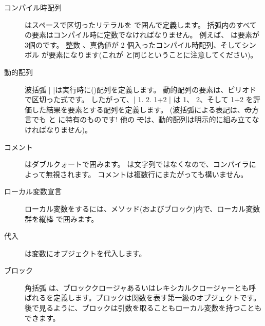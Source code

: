\documentclass[a4paper,10pt,twoside]{book}
\begin{document}
\begin{description}
\item[コンパイル時配列] はスペースで区切ったリテラルを \ct{#( )} で囲んで定義します。
		括弧内のすべての要素はコンパイル時に定数でなければなりません。
		例えば、 は要素が 3個のです。 整数 、真偽値が 2 個入ったコンパイル時配列、そしてシンボル  が要素になります(これが  と同じということに注意してください)。

\item[動的配列] 波括弧 \ct|{ }|は実行時に()配列を定義します。
		動的配列の要素は、ピリオドで区切った式です。
		したがって、\ct|{ 1. 2. 1+2 }| は 1、 2、そして 1+2 を評価した結果を要素とする配列を定義します。
		(波括弧による表記は、\st の方言でも \pharo と \squeak に特有のものです!
		他の \st では、動的配列は明示的に組み立てなければなりません)。

\item[コメント] はダブルクォートで囲みます。
		 は文字列ではなくなので、\pharo コンパイラによって無視されます。
		コメントは複数行にまたがっても構いません。
		
\item[ローカル変数宣言] ローカル変数をするには、メソッド(およびブロック)内で、ローカル変数群を縦棒 \ct{| |} で囲みます。

\item[代入] \ct{:=} は変数にオブジェクトを代入します。

\item[ブロック] 角括弧 \ct{[ ]} は、ブロッククロージャあるいはレキシカルクロージャーとも呼ばれるを定義します。ブロックは関数を表す第一級のオブジェクトです。
		後で見るように、ブロックは引数を取ることもローカル変数を持つこともできます。


\end{description}
\end{document}
